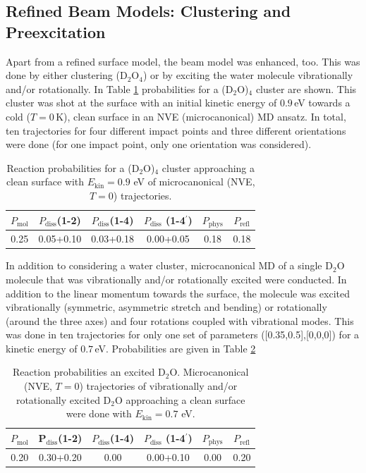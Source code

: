 \documentclass[11pt,DIV=13,BCOR=5mm,a4paper,headinclude]{scrbook}
\begin{document}
%
\subsection{Refined Beam Models: Clustering and Preexcitation}
Apart from a refined surface model, the beam model was enhanced, too.
This was done by either clustering (D$_2$O$_4$) or by exciting the water molecule vibrationally and/or rotationally.
In Table \ref{tab:4D2O-cluster} probabilities for a (D$_2$O)$_4$ cluster are shown.
This cluster was shot at the surface with an initial kinetic energy of $0.9\,$eV towards a cold ($T=0\,$K), clean surface in an NVE (microcanonical) MD ansatz.
In total, ten trajectories for four different impact points and three different orientations were done (for one impact point, only one orientation was considered).

\begin{table}[hbt]
 \centering
  \caption{Reaction probabilities for a (D$_2$O)$_4$ cluster approaching a clean surface with $E_\textrm{kin}=0.9$ eV of microcanonical (NVE, $T=0$) trajectories.}
 \begin{tabular}{cccccc}
\toprule
$P_\textrm{mol}$ & $P_\textrm{diss}$(1-2) &  $P_\textrm{diss}$(1-4) & $P_\textrm{diss}$ (1-4$^\prime$) & $P_\textrm{phys}$ & $P_\textrm{refl}$ \\\hline
0.25&0.05+0.10 &0.03+0.18 &0.00+0.05 &0.18 &0.18\\
\hline
\end{tabular}
 \label{tab:4D2O-cluster}
\end{table}

In addition to considering a water cluster, microcanonical MD of a single D$_2$O molecule that was vibrationally and/or rotationally excited were conducted.
In addition to the linear momentum towards the surface, the molecule was excited vibrationally (symmetric, asymmetric stretch and bending) or rotationally (around the three axes) and four rotations coupled with vibrational modes.
This was done in ten trajectories for only one set of parameters ([0.35,0.5],[0,0,0]) for a kinetic energy of $0.7\,$eV.
Probabilities are given in Table \ref{tab:vib-rot_exc}
\begin{table}[!h]
 \centering
  \caption{Reaction probabilities an excited D$_2$O.
Microcanonical (NVE, $T=0$) trajectories of vibrationally and/or rotationally excited D$_2$O approaching a clean surface were done with $E_\textrm{kin}=0.7$ eV.}
 \begin{tabular}{cccccc}
\toprule
$P_\textrm{mol}$ & P$_\textrm{diss}$(1-2) &  $P_\textrm{diss}$(1-4) & $P_\textrm{diss}$ (1-4$^\prime$) & $P_\textrm{phys}$ & $P_\textrm{refl}$ \\\midrule
0.20&0.30+0.20 & 0.00 &0.00+0.10 &0.00 &0.20\\
\bottomrule
\end{tabular}
 \label{tab:vib-rot_exc}
\end{table}
\end{document}
